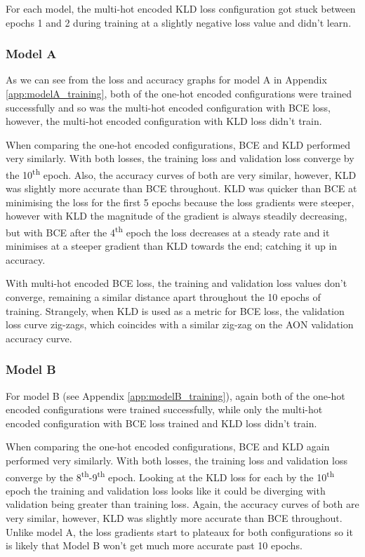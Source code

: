 \documentclass[12pt]{article}
\begin{document}
    For each model, the multi-hot encoded KLD loss configuration got stuck between epochs 1 and 2 during training at a slightly negative loss value and didn't learn. 
	
	\subsubsection{Model A}
	\label{sec:training_analysis_modelA}
	
	As we can see from the loss and accuracy graphs for model A in Appendix \ref{app:modelA_training}, both of the one-hot encoded configurations were trained successfully and so was the multi-hot encoded configuration with BCE loss, however, the multi-hot encoded configuration with KLD loss didn't train.\medskip
	
	When comparing the one-hot encoded configurations, BCE and KLD performed very similarly. With both losses, the training loss and validation loss converge by the 10\textsuperscript{th} epoch. Also, the accuracy curves of both are very similar, however, KLD was slightly more accurate than BCE throughout. KLD was quicker than BCE at minimising the loss for the first 5 epochs because the loss gradients were steeper, however with KLD the magnitude of the gradient is always steadily decreasing, but with BCE after the 4\textsuperscript{th} epoch the loss decreases at a steady rate and it minimises at a steeper gradient than KLD towards the end; catching it up in accuracy.\medskip
	
	With multi-hot encoded BCE loss, the training and validation loss values don't converge, remaining a similar distance apart throughout the 10 epochs of training. Strangely, when KLD is used as a metric for BCE loss, the validation loss curve zig-zags, which coincides with a similar zig-zag on the AON validation accuracy curve.\medskip
	
	\subsubsection{Model B}
	\label{sec:training_analysis_modelB}
	
	For model B (see Appendix \ref{app:modelB_training}), again both of the one-hot encoded configurations were trained successfully, while only the multi-hot encoded configuration with BCE loss trained and KLD loss didn't train.\medskip
	
	When comparing the one-hot encoded configurations, BCE and KLD again performed very similarly. With both losses, the training loss and validation loss converge by the 8\textsuperscript{th}-9\textsuperscript{th} epoch. Looking at the KLD loss for each by the 10\textsuperscript{th} epoch the training and validation loss looks like it could be diverging with validation being greater than training loss. Again, the accuracy curves of both are very similar, however, KLD was slightly more accurate than BCE throughout. Unlike model A, the loss gradients start to plateaux for both configurations so it is likely that Model B won't get much more accurate past 10 epochs.\medskip
	
\end{document}
